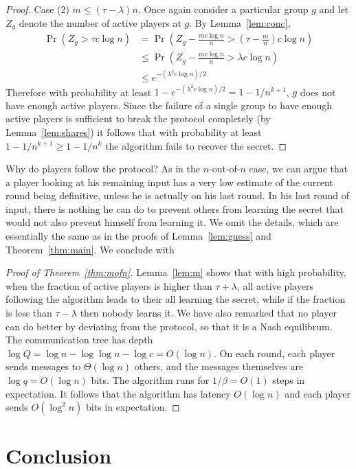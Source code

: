 \documentclass[12pt]{article}
\theoremstyle{definition}
\begin{document}
\begin{proof}
\smallskip
\noindent
Case (2) $m \le (\tau -\lambda)n$.  Once again consider a particular group
$g$ and let $Z_g$ denote the number of active players at $g$.
 By Lemma~\ref{lem:conc},
\begin{align*}
\Pr(Z_g > \tau c\log n) &= \Pr\left(Z_g -\frac{mc\log n}{n}
> \left(\tau -\frac{m}{n}\right) c\log n\right) \\ &\le \Pr\left(
Z_g -\frac{mc\log n}{n} > \lambda c\log n \right) \\ &\le
e^{-(\lambda^2 c\log n)/2}
\end{align*}
Therefore with probability at least $1- e^{-(\lambda^2 c\log n)/2} =
1- 1/n^{k+1}$, $g$ does not have enough active players. Since the failure of 
a single group to have enough active players is sufficient to break the
protocol completely (by Lemma~\ref{lem:shares}) it follows that with
probability at least $1-1/n^{k+1} \ge 1-1/n^k$ the algorithm fails to recover 
the secret.
\end{proof}

Why do players follow the protocol? As in the $n$-out-of-$n$ case, we can 
argue that a player looking at his remaining input has a very low estimate 
of the current round being definitive, unless he is actually on his last round. 
In his last round of input, there is nothing he can do to prevent others 
from learning the secret that would not also prevent himself from learning 
it. We omit the details, which are essentially the same as in the proofs of 
Lemma~\ref{lem:guess} and Theorem~\ref{thm:main}. We conclude with

\begin{proof}[Proof of Theorem~\ref{thm:mofn}]
Lemma~\ref{lem:m} shows that with high probability, when the fraction of 
active players is higher than $\tau + \lambda$, all active players following 
the algorithm leads to their all learning the secret, while if the 
fraction is less than $\tau-\lambda$ then nobody learns it. We have also 
remarked that no player can do better by  deviating from the protocol, so 
that it is a Nash equilibrum. 
The communication tree has depth $\log Q = \log n -\log\log n -\log c 
= O(\log n)$. 
On each round, each player sends messages to $\Theta(\log n)$ others, and 
the messages  themselves are $\log q  = O(\log n)$ bits. The algorithm runs 
for $1/\beta =O(1)$ steps in expectation. It follows that the algorithm has 
latency $O(\log n)$ and each player sends $O(\log^2 n)$ bits in expectation.
\end{proof}

\section{Conclusion}
\label{s:conclusion}
\end{document}
